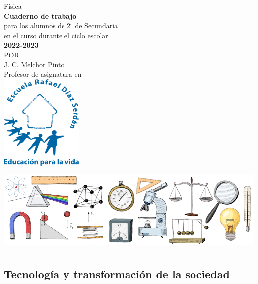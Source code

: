 \documentclass[11pt]{book}
\begin{document}
\pagestyle{empty}
\begin{center}
  {\Huge F\'isica}\\
  \vspace{2cm}
  \normalsize
  \textbf{\large Cuaderno de trabajo}\\
  para los alumnos de 2$^\circ$ de  Secundaria\\
  en el curso durante el ciclo escolar\\
  \textbf{2022-2023}\\
  \vspace{2.5cm}
  \small POR\\
  \Large J. C. Melchor Pinto\\[0.5em]
  \normalsize Profesor de asignatura en\\
  \vspace{1cm}
  \includegraphics[width=4cm]{./Unidad 2/Images/LOGO_RDS_nobg}
\end{center}
\vspace{2cm}
%
\hspace{-16mm}
\includegraphics[width=\paperwidth]{./Unidad 2/Images/cover_bg}
\restoregeometry%
\tableofcontents
\chapter{}

\section{Tecnolog\'ia y transformaci\'on de la sociedad}
\end{document}
